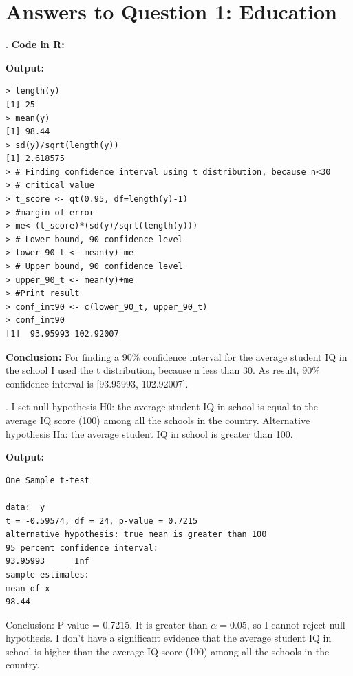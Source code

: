 \documentclass[12pt,letterpaper]{article}
\begin{document}
\newpage
\section*{Answers to Question 1: Education}

. \textbf{Code in R:}
  
\vspace{.25cm}

\noindent \textbf{Output: }
\begin{verbatim}
> length(y)
[1] 25
> mean(y)
[1] 98.44
> sd(y)/sqrt(length(y)) 
[1] 2.618575
> # Finding confidence interval using t distribution, because n<30
> # critical value
> t_score <- qt(0.95, df=length(y)-1) 
> #margin of error
> me<-(t_score)*(sd(y)/sqrt(length(y)))
> # Lower bound, 90 confidence level
> lower_90_t <- mean(y)-me
> # Upper bound, 90 confidence level
> upper_90_t <- mean(y)+me
> #Print result
> conf_int90 <- c(lower_90_t, upper_90_t)
> conf_int90
[1]  93.95993 102.92007
\end{verbatim}
\vspace{.25cm}

\noindent \textbf{Conclusion:} For finding a 90\% confidence interval for the average student IQ in the school I used the t distribution, because n less than 30. As result, 90\% confidence interval is [93.95993, 102.92007].


\newpage
{}. I set null hypothesis H0: the average student IQ in school is equal to the average IQ score (100) among all the schools in the country. Alternative hypothesis Ha: the average student IQ in school is greater than 100.


  

\noindent \textbf{Output:} 
\begin{verbatim}
One Sample t-test

data:  y
t = -0.59574, df = 24, p-value = 0.7215
alternative hypothesis: true mean is greater than 100
95 percent confidence interval:
93.95993      Inf
sample estimates:
mean of x 
98.44  
\end{verbatim}


\noindent Conclusion: P-value = 0.7215. It is greater than $\alpha=0.05$, so I cannot reject null hypothesis. I don't have a significant evidence that the average student IQ in school is higher than the average IQ score (100) among all the schools in the country.
\newpage
\end{document}
